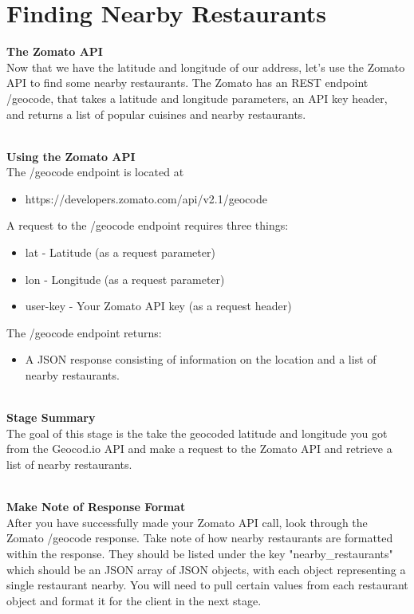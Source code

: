\documentclass{article}
\begin{document}

\section{Finding Nearby Restaurants}
\textbf{The Zomato API}\\
Now that we have the latitude and longitude of our address, let's use the Zomato API to find some nearby restaurants. The Zomato has an REST endpoint /geocode, that takes a latitude and longitude parameters, an API key header, and returns a list of popular cuisines and nearby restaurants.

\-\ \\
\textbf{Using the Zomato API} \\
The /geocode endpoint is located at
\begin{itemize}
\item https://developers.zomato.com/api/v2.1/geocode
\end{itemize}
A request to the /geocode endpoint requires three things:
\begin{itemize}
\item lat - Latitude (as a request parameter)
\item lon - Longitude (as a request parameter)
\item user-key - Your Zomato API key (as a request header)
\end{itemize}
The /geocode endpoint returns:
\begin{itemize}
\item A JSON response consisting of information on the location and a list of nearby restaurants.
\end{itemize}

\-\ \\
\textbf{Stage Summary}\\
The goal of this stage is the take the geocoded latitude and longitude you got from the Geocod.io API and make a request to the Zomato API and retrieve a list of nearby restaurants.

\-\ \\
\textbf{Make Note of Response Format}\\
After you have successfully made your Zomato API call, look through the Zomato /geocode response. Take note of how nearby restaurants are formatted within the response. They should be listed under the key "nearby\_restaurants" which should be an JSON array of JSON objects, with each object representing a single restaurant nearby. You will need to pull certain values from each restaurant object and format it for the client in the next stage. 
\end{document}
